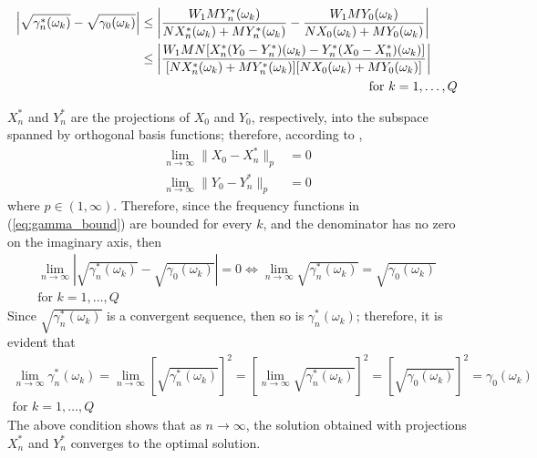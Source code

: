 \documentclass[12pt]{article}
\begin{document}
\begin{equation} \label{eq:gamma_bound}
\begin{aligned}
\left\lvert \sqrt{\gamma_n^*(\omega_k)} - \sqrt{\gamma_0(\omega_k)} \right\rvert  &\leq  \left\lvert  \frac{W_1MY_n^*(\omega_k)}{NX_n^*(\omega_k) + MY_n^*(\omega_k)} - \frac{W_1MY_0(\omega_k)}{NX_0(\omega_k) + MY_0(\omega_k)}   \right\rvert \\  &\leq \left\lvert  \frac{W_1MN[X_n^*(Y_0-Y_n^*)(\omega_k) - Y_n^*(X_0-X_n^*)(\omega_k)]}{[NX_n^*(\omega_k) + MY_n^*(\omega_k)][NX_0(\omega_k)+MY_0(\omega_k)]} \right\rvert \\ & \hspace{6.3cm} \mbox{for } k=1,\ldots,Q
 \end{aligned}
\end{equation}

$X_n^*$ and $Y_n^*$ are the projections of $X_0$ and $Y_0$, respectively, into the subspace spanned by orthogonal basis functions; therefore, according to \cite{AN99b},
\begin{equation} 
\begin{aligned}
\lim_{n \to \infty} \|X_0 - X_n^* \|_p &=0\\
\lim_{n \to \infty} \|Y_0 - Y_n^* \|_p &=0
 \end{aligned}
\end{equation}
where $p \in (1,\infty)$. Therefore, since the frequency functions in (\ref{eq:gamma_bound}) are bounded for every $k$, and the denominator has no zero on the imaginary axis, then
\begin{equation} 
\begin{aligned}
\lim_{n \to \infty} \left\lvert \sqrt{\gamma_n^*(\omega_k)} - \sqrt{\gamma_0(\omega_k)} \right\rvert =0 \Longleftrightarrow \lim_{n \to \infty} \sqrt{\gamma_n^*(\omega_k)} = \sqrt{\gamma_0(\omega_k)} \\
\mbox{for } k = 1,\ldots,Q
 \end{aligned}
\end{equation}
Since $\sqrt{\gamma_n^*(\omega_k)}$ is a convergent sequence, then so is $\gamma_n^*(\omega_k)$; therefore, it is evident that
\begin{equation} 
\begin{aligned}
\lim_{n \to \infty} \gamma_n^*(\omega_k) =   \lim_{n \to \infty}  \left[ \sqrt{\gamma_n^*(\omega_k)}\right] ^2 = \left[ \lim_{n \to \infty}  \sqrt{\gamma_n^*(\omega_k)}\right] ^2 = \left[ \sqrt{\gamma_0(\omega_k)}\right] ^2 = \gamma_0(\omega_k)\\
\mbox{for } k = 1,\ldots,Q
 \end{aligned}
\end{equation}
The above condition shows that as $n \rightarrow \infty$, the solution obtained with projections $X_n^*$ and $Y_n^*$ converges to the optimal solution. 
\end{document}
